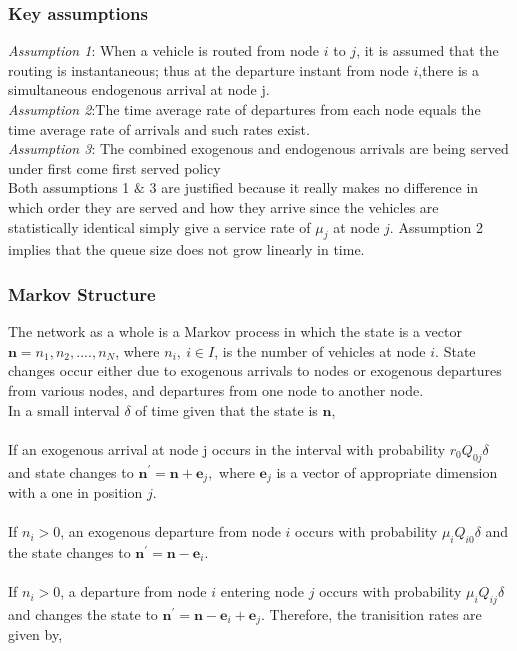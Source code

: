 \documentclass[a4paper,12pt]{scrartcl}
\begin{document}
\subsubsection*{Key assumptions}
\textit{Assumption 1}: When a vehicle is routed from node $i$ to $j$, it is assumed that the routing is instantaneous; thus at the departure instant from node $i$,there is a simultaneous endogenous arrival at node j.\\
\textit{Assumption 2}:The time average rate of departures from each node equals the time average rate of arrivals and such rates exist.\\
\textit{Assumption 3}: The combined exogenous and endogenous arrivals are being served under first come first served policy\\
Both assumptions 1 $\&$ 3 are justified because it really makes no difference in which order they are served and how they arrive since the vehicles are statistically identical  simply give a service rate of $\mu_j$ at node $j$. Assumption 2 implies that the queue size does not grow linearly in time. 
\subsubsection*{Markov Structure}
The network as a whole is a Markov process in which the state is a vector $\textbf{n} = {n_1,n_2,....,n_N}$, where $n_i, ~i \in I$, is the number of vehicles at node $i$. State changes occur either due to exogenous arrivals to nodes or exogenous departures from various nodes, and departures from one node to another node.\\
In a small interval $\delta$ of time given that the state is $\textbf{n}$,\\
\\
If an exogenous arrival at node j occurs in the interval with probability $r_0Q_{0j}\delta$ and state changes to $\textbf{n}^{\prime} = \textbf{n} + \textbf{e}_j,$ where $\textbf{e}_j$ is a vector of appropriate dimension with a one in position $j$.\\
\\
If $n_i > 0 $, an exogenous departure from node $i$ occurs with probability $\mu_iQ_{i0}\delta$ and the state changes to $\textbf{n}^{\prime} = \textbf{n} - \textbf{e}_i.$\\
\\ 
If $n_i > 0 $, a departure from node $i$ entering node $j$ occurs with probability $\mu_iQ_{ij}\delta$ and changes the state to $\textbf{n}^{\prime} = \textbf{n} - \textbf{e}_i + \textbf{e}_j.$ Therefore, the tranisition rates are given by,
\end{document}
